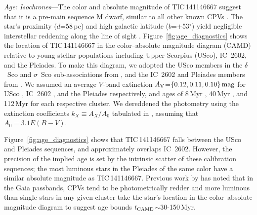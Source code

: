 \documentclass[11pt,twocolumn,tighten]{aastex7}
\begin{document}
{\it Age: Isochrones}---The color and absolute magnitude of
TIC\,141146667 suggest that it is a pre-main sequence M dwarf, similar
to all other known CPVs \citep{Stauffer2017,Stauffer2021,Bouma2024}.
The star's proximity ($d$=58\,pc) and high galactic latitude
($b$=$+$53$^\circ$) yield negligible interstellar reddening along the
line of sight \citep{Green2019}.  Figure~\ref{fig:age_diagnostics}
shows the location of TIC\,141146667 in the color--absolute magnitude
diagram (CAMD) relative to young stellar populations including Upper
Scorpius (USco), IC~2602, and the Pleiades.  To make this diagram, we
adopted the USco members in the $\delta$~Sco and $\sigma$~Sco
sub-associations from \citet{Ratzenbock2023}, and the IC~2602 and
Pleiades members from \citet{Hunt2024}.  We assumed an average $V$-band
extinction $A_{\rm V}$=$\{0.12, 0.11, 0.10\}\,{\rm mag}$ for USco
\citep{Pecaut2016}, IC~2602 \citep{Hunt2024}, and the Pleiades
\citep{Hunt2024} respectively, and ages of 8\,Myr
\citep{Ratzenbock2023}, 40\,Myr \citep{Randich2018}, and 112\,Myr
\citep{Dahm2015} for each respective cluster.  We dereddened the
photometry using the extinction coefficients $k_X\equiv A_X/A_0$
tabulated in \citep{GaiaCollaboration2018}, assuming that $A_0 = 3.1
E(B-V)$.

Figure~\ref{fig:age_diagnostics} shows that TIC\,141146667 falls
between the USco and Pleiades sequences, and approximately overlaps
IC~2602.  However, the precision of the implied age is set by the
intrinsic scatter of these calibration sequences; the most luminous
stars in the Pleiades of the same color have a similar absolute
magnitude as TIC\,141146667.  Previous work by \citet{Stauffer2021} has
noted that in the Gaia passbands, CPVs tend to be photometrically
redder and more luminous than single stars in any given
cluster
take the star's location in the color--absolute magnitude diagram
to suggest age bounds $t_{\rm CAMD}$$\sim$30-150\,Myr.
\end{document}
